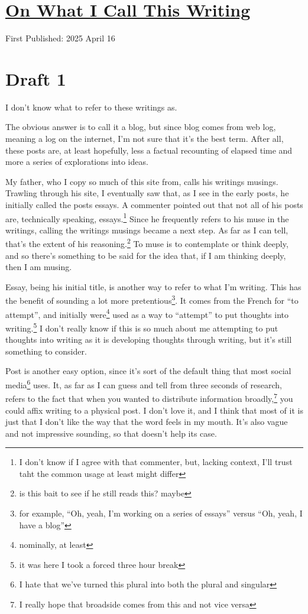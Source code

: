 \documentclass[12pt]{article}
\newcommand{\say}[1]{``#1''}
\renewcommand{\,}{\textsuperscript{,}}
\begin{document}
  
\doublespacing  
\section{\href{verbiage.html}{On What I Call This Writing}}  
First Published: 2025 April 16

\section{Draft 1}

I don't know what to refer to these writings as.

The obvious answer is to call it a blog, but since blog comes from web log, meaning a log on the internet, I'm not sure that it's the best term.  
After all, these posts are, at least hopefully, less a factual recounting of elapsed time and more a series of explorations into ideas.

My father, who I copy so much of this site from, calls his writings musings.  
Trawling through his site, I eventually saw that, as I see in the early posts, he initially called the posts essays.  
A commenter pointed out that not all of his posts are, technically speaking, essays.\footnote{I don't know if I agree with that commenter, but, lacking context, I'll trust taht the common usage at least might differ}  
Since he frequently refers to his muse in the writings, calling the writings musings became a next step.  
As far as I can tell, that's the extent of his reasoning.\footnote{is this bait to see if he still reads this? maybe}  
To muse is to contemplate or think deeply, and so there's something to be said for the idea that, if I am thinking deeply, then I am musing.

Essay, being his initial title, is another way to refer to what I'm writing.  
This has the benefit of sounding a lot more pretentious\footnote{for example, \say{Oh, yeah, I'm working on a series of essays} versus \say{Oh, yeah, I have a blog}}.  
It comes from the French for \say{to attempt}, and initially were\footnote{nominally, at least} used as a way to \say{attempt} to put thoughts into writing.\footnote{it was here I took a forced three hour break}  
I don't really know if this is so much about me attempting to put thoughts into writing as it is developing thoughts through writing, but it's still something to consider.

Post is another easy option, since it's sort of the default thing that most social media\footnote{I hate that we've turned this plural into both the plural and singular} uses.  
It, as far as I can guess and tell from three seconds of research, refers to the fact that when you wanted to distribute information broadly,\footnote{I really hope that broadside comes from this and not vice versa} you could affix writing to a physical post.  
I don't love it, and I think that most of it is just that I don't like the way that the word feels in my mouth.  
It's also vague and not impressive sounding, so that doesn't help its case.
\end{document}
